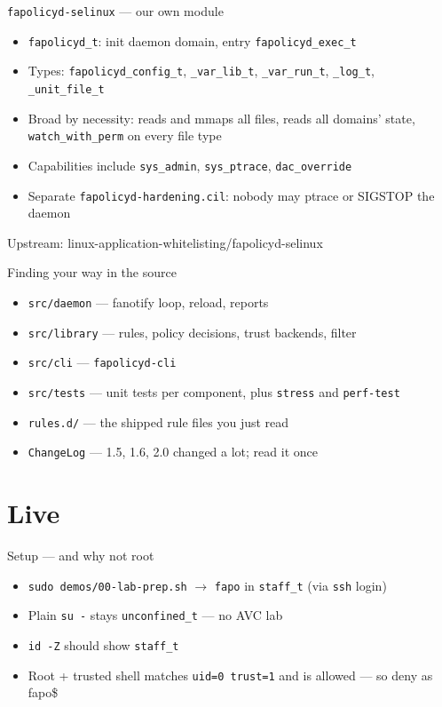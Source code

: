 \documentclass[aspectratio=169,11pt]{beamer}
\newcommand{\ok}[1]{\textcolor{allowc}{#1}}
\newcommand{\fapop}{\textcolor{fapoc}{fapo\$}}
\begin{document}
\begin{frame}{\texttt{fapolicyd-selinux} --- our own module}
  \begin{itemize}
    \item \texttt{fapolicyd\_t}: init daemon domain, entry \texttt{fapolicyd\_exec\_t}
    \item Types: \texttt{fapolicyd\_config\_t}, \texttt{\_var\_lib\_t},
          \texttt{\_var\_run\_t}, \texttt{\_log\_t}, \texttt{\_unit\_file\_t}
    \item Broad by necessity: reads and mmaps all files, reads all domains' state,\\
          \texttt{watch\_with\_perm} on every file type
    \item Capabilities include \texttt{sys\_admin}, \texttt{sys\_ptrace}, \texttt{dac\_override}
    \item Separate \texttt{fapolicyd-hardening.cil}: nobody may ptrace or SIGSTOP the daemon
  \end{itemize}
  \vspace{0.3em}
  {\small Upstream: linux-application-whitelisting/fapolicyd-selinux}
\end{frame}

\begin{frame}{Finding your way in the source}
  \begin{itemize}
    \item \texttt{src/daemon} --- fanotify loop, reload, reports
    \item \texttt{src/library} --- rules, policy decisions, trust backends, filter
    \item \texttt{src/cli} --- \texttt{fapolicyd-cli}
    \item \texttt{src/tests} --- unit tests per component, plus \texttt{stress}
          and \texttt{perf-test}
    \item \texttt{rules.d/} --- the shipped rule files you just read
    \item \texttt{ChangeLog} --- 1.5, 1.6, 2.0 changed a lot; read it once
  \end{itemize}
\end{frame}

\section{Live}

\begin{frame}{Setup --- and why not root}
  \begin{itemize}
    \item \texttt{sudo demos/00-lab-prep.sh}
          $\rightarrow$ \texttt{fapo} in \texttt{staff\_t} (via \texttt{ssh} login)
    \item Plain \texttt{su -} stays \texttt{unconfined\_t} --- no AVC lab
    \item \texttt{id -Z} should show \texttt{staff\_t}
    \item Root + trusted shell matches \texttt{uid=0 trust=1} and is \ok{allowed}
          --- so deny as \fapop
  \end{itemize}
\end{frame}
\end{document}
